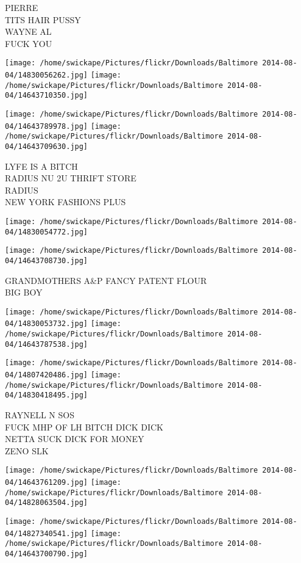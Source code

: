 \documentclass[10pt,letterpaper]{article}
\begin{document}
PIERRE\\
TITS HAIR PUSSY\\
WAYNE AL\\
FUCK YOU
\pagebreak

\texttt{[image: /home/swickape/Pictures/flickr/Downloads/Baltimore 2014-08-04/14830056262.jpg]}
\texttt{[image: /home/swickape/Pictures/flickr/Downloads/Baltimore 2014-08-04/14643710350.jpg]}

\texttt{[image: /home/swickape/Pictures/flickr/Downloads/Baltimore 2014-08-04/14643789978.jpg]}
\texttt{[image: /home/swickape/Pictures/flickr/Downloads/Baltimore 2014-08-04/14643709630.jpg]}

LYFE IS A BITCH\\
RADIUS NU 2U THRIFT STORE\\
RADIUS\\
NEW YORK FASHIONS PLUS
\pagebreak

\texttt{[image: /home/swickape/Pictures/flickr/Downloads/Baltimore 2014-08-04/14830054772.jpg]}

\vspace{0.25in}
\texttt{[image: /home/swickape/Pictures/flickr/Downloads/Baltimore 2014-08-04/14643708730.jpg]}

GRANDMOTHERS A\&P FANCY PATENT FLOUR\\
BIG BOY
\pagebreak

\texttt{[image: /home/swickape/Pictures/flickr/Downloads/Baltimore 2014-08-04/14830053732.jpg]}
\texttt{[image: /home/swickape/Pictures/flickr/Downloads/Baltimore 2014-08-04/14643787538.jpg]}

\texttt{[image: /home/swickape/Pictures/flickr/Downloads/Baltimore 2014-08-04/14807420486.jpg]}
\texttt{[image: /home/swickape/Pictures/flickr/Downloads/Baltimore 2014-08-04/14830418495.jpg]}

RAYNELL N SOS\\
FUCK MHP OF LH BITCH DICK DICK\\
NETTA SUCK DICK FOR MONEY\\
ZENO SLK
\pagebreak

\texttt{[image: /home/swickape/Pictures/flickr/Downloads/Baltimore 2014-08-04/14643761209.jpg]}
\texttt{[image: /home/swickape/Pictures/flickr/Downloads/Baltimore 2014-08-04/14828063504.jpg]}

\texttt{[image: /home/swickape/Pictures/flickr/Downloads/Baltimore 2014-08-04/14827340541.jpg]}
\texttt{[image: /home/swickape/Pictures/flickr/Downloads/Baltimore 2014-08-04/14643700790.jpg]}
\end{document}
